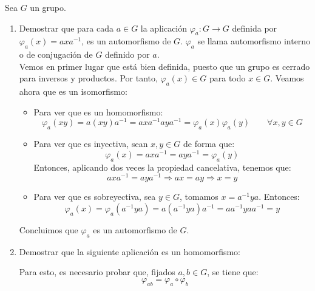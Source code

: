 \begin{ejercicio}
    Sea $G$ un grupo.
    \begin{enumerate}
        \item Demostrar que para cada $a\in G$ la aplicación $\varphi_a:G\to G$ definida por $\varphi_a(x)=axa^{-1}$, es un automorfismo de $G$. $\varphi_a$ se llama automorfismo interno o de conjugación de $G$ definido por $a$.\\
        
        Vemos en primer lugar que está bien definida, puesto que un grupo es cerrado para inversos y productos. Por tanto, $\varphi_a(x)\in G$ para todo $x\in G$. Veamos ahora que es un isomorfismo:
        \begin{itemize}
            \item Para ver que es un homomorfismo:
                \begin{equation*}
                    \varphi_a(xy) = a(xy)a^{-1} = axa^{-1}aya^{-1} = \varphi_a(x)\varphi_a(y) \qquad \forall x,y\in G
                \end{equation*}

            \item Para ver que es inyectiva, sean $x,y\in G$ de forma que:
                \begin{equation*}
                    \varphi_a(x) = axa^{-1} = aya^{-1} = \varphi_a(y)
                \end{equation*}
                Entonces, aplicando dos veces la propiedad cancelativa, tenemos que:
                \begin{equation*}
                    axa^{-1} = aya^{-1} \Longrightarrow ax = ay \Longrightarrow x = y
                \end{equation*}

            \item Para ver que es sobreyectiva, sea $y\in G$, tomamos $x=a^{-1}ya$. Entonces:
                \begin{equation*}
                    \varphi_a(x) = \varphi_a(a^{-1}ya) = a(a^{-1}ya)a^{-1} = aa^{-1}yaa^{-1} = y
                \end{equation*}
        \end{itemize}
        Concluimos que $\varphi_a$ es un automorfismo de $G$.
        \item Demostrar que la siguiente aplicación es un homomorfismo:

        Para esto, es necesario probar que, fijados $a,b\in G$, se tiene que:
        \begin{equation*}
            \varphi_{ab} = \varphi_a\circ\varphi_b
        \end{equation*}


\end{enumerate}
\end{ejercicio}
